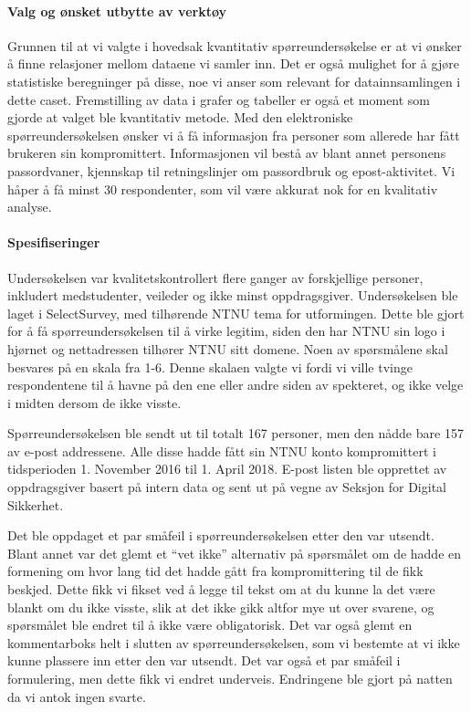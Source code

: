 \paragraph{Valg og ønsket utbytte av verktøy}
Grunnen til at vi valgte i hovedsak kvantitativ spørreundersøkelse er at vi ønsker å finne relasjoner mellom dataene vi samler inn. Det er også mulighet for å gjøre statistiske beregninger på disse, noe vi anser som relevant for datainnsamlingen i dette caset. Fremstilling av data i grafer og tabeller er også et moment som gjorde at valget ble kvantitativ metode. Med den elektroniske spørreundersøkelsen ønsker vi å få informasjon fra personer som allerede har fått brukeren sin kompromittert. Informasjonen vil bestå av blant annet personens passordvaner, kjennskap til retningslinjer om passordbruk og epost-aktivitet. Vi håper å få minst 30 respondenter, som vil være akkurat nok for en kvalitativ analyse. 

\paragraph{Spesifiseringer}
Undersøkelsen var kvalitetskontrollert flere ganger av forskjellige personer, inkludert medstudenter, veileder og ikke minst oppdragsgiver. Undersøkelsen ble laget i SelectSurvey, med tilhørende NTNU tema for utformingen. Dette ble gjort for å få spørreundersøkelsen til å virke legitim, siden den har NTNU sin logo i hjørnet og nettadressen tilhører NTNU sitt domene. Noen av spørsmålene skal besvares på en skala fra 1-6. Denne skalaen valgte vi fordi vi ville tvinge respondentene til å havne på den ene eller andre siden av spekteret, og ikke velge i midten dersom de ikke visste. 

Spørreundersøkelsen ble sendt ut til totalt 167 personer, men den nådde bare 157 av e-post addressene. Alle disse hadde fått sin NTNU konto kompromittert i tidsperioden 1. November 2016 til 1. April 2018. E-post listen ble opprettet av oppdragsgiver basert på intern data og sent ut på vegne av Seksjon for Digital Sikkerhet. 

Det ble oppdaget et par småfeil i spørreundersøkelsen etter den var utsendt. Blant annet var det glemt et ``vet ikke'' alternativ på spørsmålet om de hadde en formening om hvor lang tid det hadde gått fra kompromittering til de fikk beskjed. Dette fikk vi fikset ved å legge til tekst om at du kunne la det være blankt om du ikke visste, slik at det ikke gikk altfor mye ut over svarene, og spørsmålet ble endret til å ikke være obligatorisk. Det var også glemt en kommentarboks helt i slutten av spørreundersøkelsen, som vi bestemte at vi ikke kunne plassere inn etter den var utsendt. Det var også et par småfeil i formulering, men dette fikk vi endret underveis. Endringene ble gjort på natten da vi antok ingen svarte. 


